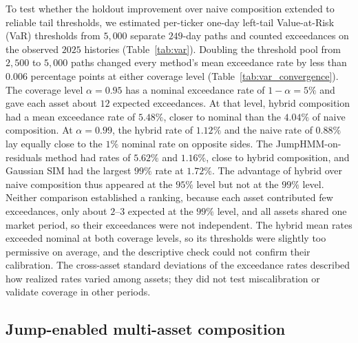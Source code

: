 To test whether the holdout improvement over naive composition
extended to reliable tail thresholds, we estimated per-ticker one-day
left-tail Value-at-Risk (VaR) thresholds from $5{,}000$ separate
$249$-day paths and counted exceedances on the observed $2025$
histories (Table~\ref{tab:var}). Doubling the threshold pool from
$2{,}500$ to $5{,}000$ paths changed every method's mean exceedance
rate by less than $0.006$ percentage points at either coverage level
(Table~\ref{tab:var_convergence}). The coverage level
$\alpha=0.95$ has a nominal exceedance rate of $1-\alpha=5\%$ and gave
each asset about $12$ expected exceedances. At that level, hybrid
composition had a mean
exceedance rate of $5.48\%$, closer to nominal than the $4.04\%$ of
naive composition. At $\alpha=0.99$, the hybrid rate of $1.12\%$ and
the naive rate of $0.88\%$ lay equally close to the $1\%$ nominal rate
on opposite sides. The JumpHMM-on-residuals method had rates of
$5.62\%$ and $1.16\%$, close to hybrid composition, and Gaussian SIM
had the largest $99\%$ rate at $1.72\%$. The advantage of hybrid over
naive composition thus appeared at the $95\%$ level but not at the
$99\%$ level. Neither comparison established a ranking, because each
asset contributed few exceedances, only about $2$--$3$ expected at the
$99\%$ level, and all assets shared one market period, so their
exceedances were not independent. The hybrid mean rates exceeded
nominal at both coverage levels, so its thresholds were slightly too
permissive on average, and the descriptive check could not confirm
their calibration. The
cross-asset standard deviations of the exceedance rates described how
realized rates varied among assets; they did not test miscalibration
or validate coverage in other periods.




\subsection{Jump-enabled multi-asset composition}
\label{sec:results-jump-composition}

